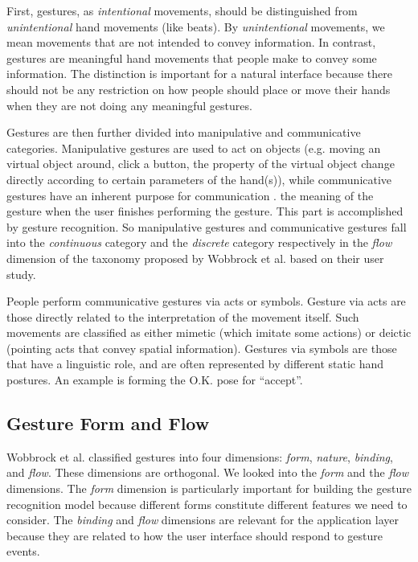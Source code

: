 First, gestures, as \textit{intentional} movements, should be distinguished from
\textit{unintentional} hand movements (like beats). By \textit{unintentional}
movements, we mean movements that are not intended to convey information. In
contrast, gestures are meaningful hand movements that people make to convey some
information. The distinction is important for a natural interface because there
should not be any restriction on how people should place or move their hands
when they are not doing any meaningful gestures. 

Gestures are then further divided into manipulative and communicative
categories. Manipulative gestures are used to act on objects (e.g.
moving an virtual object around, click a button, the property of the virtual
object change directly according to certain parameters of the hand(s)), while
communicative gestures have an inherent purpose for communication \cite{Pavlovic97}. 
the meaning of the gesture when the user finishes performing the gesture. This part is
accomplished by gesture recognition. So manipulative gestures and communicative
gestures fall into the \textit{continuous} category and the
\textit{discrete} category respectively in the \textit{flow} dimension of the
taxonomy proposed by Wobbrock \cite{wobbrock09} et al. based on their
user study.

People perform communicative gestures via acts or symbols. Gesture via acts are
those directly related to the interpretation of the movement itself. Such
movements are classified as either mimetic (which imitate some actions) or
deictic (pointing acts that convey spatial information). Gestures via symbols
are those that have a linguistic role, and are often represented by different static hand postures. An example is forming the
O.K. pose for ``accept''. 

\subsection{Gesture Form and Flow}
Wobbrock et al. \cite{wobbrock09} classified gestures into four dimensions:
\textit{form}, \textit{nature}, \textit{binding}, and \textit{flow}. These
dimensions are orthogonal. We looked into the \textit{form} and the
\textit{flow} dimensions. The \textit{form} dimension is particularly important
for building the gesture recognition model because different forms constitute
different features we need to consider. The \textit{binding} and \textit{flow}
dimensions are relevant for the application layer because they are related to
how the user interface should respond to gesture events.

